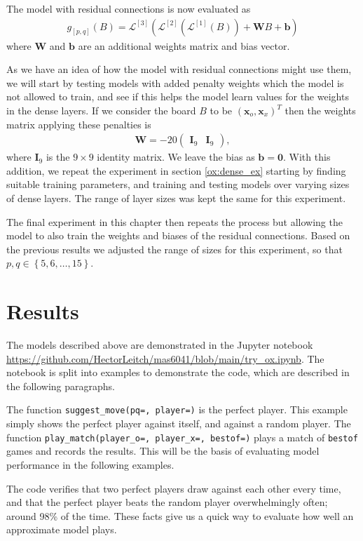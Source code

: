 \documentclass{somasmsc}
\begin{document}
The model with residual connections is now evaluated as
\begin{align*}
    g_{\left[p,q\right]}\left(B\right) = \mathcal{L}^{\left[3\right]}\left( \mathcal{L}^{\left[2\right]}\left( \mathcal{L}^{\left[1\right]}\left(B\right)\right) + \mathbf{W}B + \pmb{b}\right)
\end{align*}
where $\mathbf{W}$ and $\pmb{b}$ are an additional weights matrix and bias vector.

As we have an idea of how the model with residual connections might use them, we will start by testing models with added penalty weights which the model is not allowed to train, and see if this helps the model learn values for the weights in the dense layers. If we consider the board $B$ to be $\left(\pmb{x}_o, \pmb{x}_x\right)^T$ then the weights matrix applying these penalties is
\begin{align*}
    \mathbf{W} = -20
    \begin{pmatrix}
        \mathbf{I}_{9} & \mathbf{I}_{9}
    \end{pmatrix},
\end{align*}
where $\mathbf{I}_9$ is the $9 \times 9$ identity matrix. We leave the bias as $\pmb{b} = \mathbf{0}$. With this addition, we repeat the experiment in section \ref{ox:dense_ex} starting by finding suitable training parameters, and training and testing models over varying sizes of dense layers. The range of layer sizes was kept the same for this experiment.

The final experiment in this chapter then repeats the process but allowing the model to also train the weights and biases of the residual connections. Based on the previous results we adjusted the range of sizes for this experiment, so that $p,q \in \left\{5, 6, \dots, 15\right\}$.


\section{Results}

The models described above are demonstrated in the Jupyter notebook \url{https://github.com/HectorLeitch/mas6041/blob/main/try_ox.ipynb}. The notebook is split into examples to demonstrate the code, which are described in the following paragraphs.


\begin{exa}
The function \verb|suggest_move(pq=, player=)| is the perfect player. This example simply shows the perfect player against itself, and against a random player. The function \verb|play_match(player_o=, player_x=, bestof=)| plays a match of \verb|bestof| games and records the results. This will be the basis of evaluating model performance in the following examples.

The code verifies that two perfect players draw against each other every time, and that the perfect player beats the random player overwhelmingly often; around 98\% of the time. These facts give us a quick way to evaluate how well an approximate model plays.
\end{exa}
\end{document}
